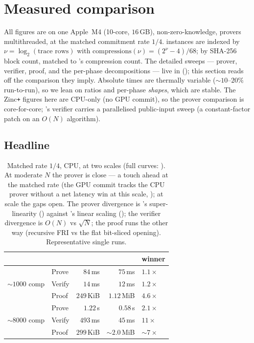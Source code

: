 \section{Measured comparison}
\label{sec:results}

All figures are on one Apple~M4 (10-core, $16$\,GB), non-zero-knowledge,
provers multithreaded, at the matched commitment rate $1/4$. \zinc{} instances
are indexed by $\nu=\log_2(\text{trace rows})$ with
$\mathrm{compressions}(\nu)=(2^\nu-4)/68$; \binius{} by SHA-256 block count,
matched to \zinc{}'s compression count. The detailed sweeps --- prover,
verifier, proof, and the per-phase decompositions --- live in 
(); this section reads off the
comparison they imply. Absolute times are thermally variable
($\sim$$10$--$20\%$ run-to-run), so we lean on ratios and per-phase
\emph{shapes}, which are stable. The Zinc\texttt{+} figures here are CPU-only
(no GPU commit), so the prover comparison is core-for-core; \binius{}'s
verifier carries a parallelised public-input sweep (a constant-factor patch on
an $O(N)$ algorithm).

\subsection{Headline}
\label{sec:res-headline}

\begin{table}[t]
\centering
\renewcommand{\arraystretch}{1.2}
\begin{tabular}{@{}llrrl@{}}
\toprule
& & \binius{} & \zinc{} & winner \\
\midrule
\multirow{3}{*}{$\sim$$1000$ comp}
  & Prove   & $84$\,ms    & $75$\,ms    & \zinc{} $1.1\times$ \\
  & Verify  & $14$\,ms    & $12$\,ms    & \zinc{} $1.2\times$ \\
  & Proof   & $249$\,KiB  & $1.12$\,MiB & \binius{} $4.6\times$ \\
\midrule
\multirow{3}{*}{$\sim$$8000$ comp}
  & Prove   & $1.22$\,s   & $0.58$\,s   & \zinc{} $2.1\times$ \\
  & Verify  & $493$\,ms   & $45$\,ms    & \zinc{} $11\times$ \\
  & Proof   & $299$\,KiB  & $\sim$$2.0$\,MiB & \binius{} $\sim$$7\times$ \\
\bottomrule
\end{tabular}
\caption{Matched rate $1/4$, CPU, at two scales (full curves:
). At moderate $N$ the prover is close ---
\zinc{} a touch ahead at the matched rate (the GPU commit tracks the CPU
prover without a net latency win at this scale, );
at scale the gaps open. The prover divergence is
\binius{}'s super-linearity () against \zinc{}'s linear
scaling (); the verifier divergence is $O(N)$ vs $\sqrt N$;
the proof runs the other way (recursive FRI vs the flat bit-sliced opening).
Representative single runs.}
\label{tab:headline}
\end{table}

